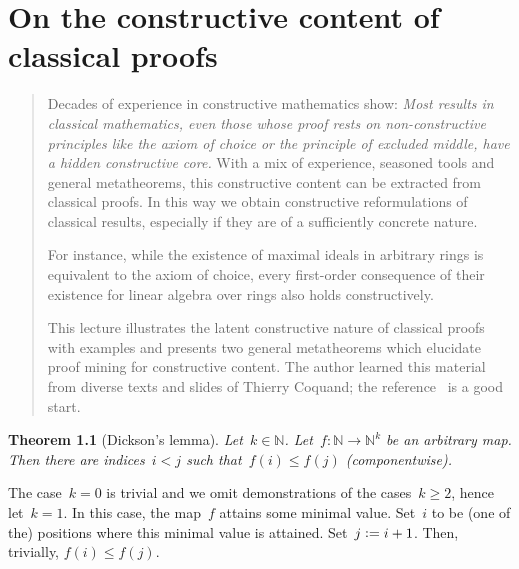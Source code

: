 \documentclass[10pt,reqno,a4paper,openany]{amsbook}
\makeatletter
\theoremstyle{definition}
\theoremstyle{plain}
\newtheorem{thm}[defn]{Theorem}
\theoremstyle{remark}
\newcommand{\NN}{\mathbb{N}}
\newcommand{\?}{\,{:}\,}
\renewcommand{\_}{\mathpunct{.}\,}
\newcommand{\defeq}{\vcentcolon=}
\renewenvironment{proof}[1][\proofname]{\par
  \pushQED{\qed}%
  \normalfont \topsep6\p@\@plus6\p@\relax
  \trivlist
  \item[\hskip\labelsep
        \itshape
    #1\@addpunct{.}]\ignorespaces
}{%
  \popQED\endtrivlist\@endpefalse
}
\newenvironment{intro}{\begin{quote}}{\end{quote}\bigskip}
\makeatother
\begin{document}


\chapter{On the constructive content of classical proofs}
\label{lect:constructive-content}

\begin{intro}
Decades of experience in constructive mathematics show: \emph{Most results
in classical mathematics, even those whose proof rests on
non-constructive principles like the axiom of choice or the principle of
excluded middle, have a hidden constructive core.} With a mix of
experience, seasoned tools and general metatheorems, this constructive
content can be extracted from classical proofs. In this way we obtain
constructive reformulations of classical results, especially
if they are of a sufficiently concrete nature.

For instance, while the existence of maximal ideals in arbitrary rings
is equivalent to the axiom of choice, every first-order consequence of
their existence for linear algebra over rings also holds constructively.

This lecture illustrates the latent constructive nature of classical
proofs with examples and presents two general metatheorems which
elucidate proof mining for constructive content. The author learned this
material from diverse texts and slides of Thierry Coquand; the
reference~\cite{coquand:classical} is a good start.
\end{intro}

\begin{thm}[Dickson's lemma]\label{thm:dickson}
Let~$k \in \NN$. Let~$f : \NN \to \NN^k$ be an arbitrary map. Then there are
indices~$i < j$ such that~$f(i) \leq f(j)$ (componentwise).
\end{thm}

\begin{proof}[Proof (classical)]The case~$k = 0$ is trivial and we omit demonstrations of the cases~$k
\geq 2$, hence let~$k = 1$. In this case, the map~$f$ attains some minimal
value. Set~$i$ to be (one of the) positions where this minimal value is
attained. Set~$j \defeq i+1$. Then, trivially, $f(i) \leq f(j)$.
\end{proof}
\end{document}
